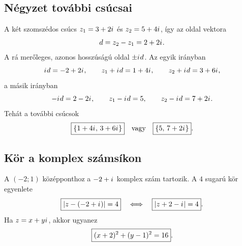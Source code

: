 \documentclass{szb-solution}
\begin{document}
\subsection{Négyzet további csúcsai}

A két szomszédos csúcs $z_1=3+2{i\mkern1mu}$ és $z_2=5+4{i\mkern1mu}$, így az oldal vektora
$$
  d=z_2-z_1=2+2{i\mkern1mu}
  \text.
$$
A rá merőleges, azonos hosszúságú oldal $\pm{i\mkern1mu} d$. Az egyik irányban
$$
  {i\mkern1mu} d=-2+2{i\mkern1mu},
  \qquad
  z_1+{i\mkern1mu} d=1+4{i\mkern1mu},
  \qquad
  z_2+{i\mkern1mu} d=3+6{i\mkern1mu}
  \text,
$$
a másik irányban
$$
  -{i\mkern1mu} d=2-2{i\mkern1mu},
  \qquad
  z_1-{i\mkern1mu} d=5,
  \qquad
  z_2-{i\mkern1mu} d=7+2{i\mkern1mu}
  \text.
$$
Tehát a további csúcsok
$$
  \boxed{\{1+4{i\mkern1mu},\,3+6{i\mkern1mu}\}}
  \quad\text{vagy}\quad
  \boxed{\{5,\,7+2{i\mkern1mu}\}}
  \text.
$$

\subsection{Kör a komplex számsíkon}

A $(-2;1)$ középponthoz a $-2+{i\mkern1mu}$ komplex szám tartozik. A $4$ sugarú kör
egyenlete
$$
  \boxed{|z-(-2+{i\mkern1mu})|=4}
  \quad\Longleftrightarrow\quad
  \boxed{|z+2-{i\mkern1mu}|=4}
  \text.
$$
Ha $z=x+y{i\mkern1mu}$, akkor ugyanez
$$
  \boxed{(x+2)^2+(y-1)^2=16}
  \text.
$$
\end{document}
